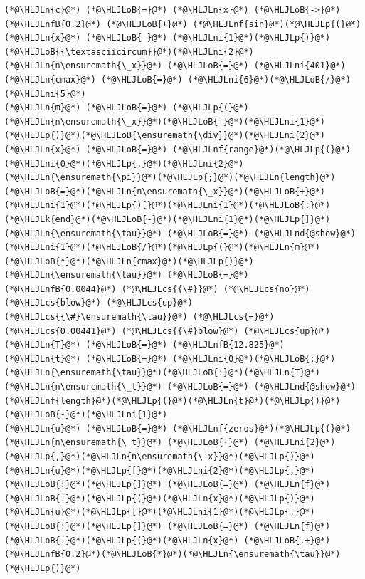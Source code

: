 \documentclass[12pt,a4paper]{article}
\newcommand{\HLJLk}[1]{\textcolor[RGB]{148,91,176}{\textbf{#1}}}
\newcommand{\HLJLn}[1]{#1}
\newcommand{\HLJLnd}[1]{\textcolor[RGB]{214,102,97}{#1}}
\newcommand{\HLJLnf}[1]{\textcolor[RGB]{66,102,213}{#1}}
\newcommand{\HLJLnfB}[1]{\textcolor[RGB]{59,151,46}{#1}}
\newcommand{\HLJLni}[1]{\textcolor[RGB]{59,151,46}{#1}}
\newcommand{\HLJLoB}[1]{\textcolor[RGB]{102,102,102}{\textbf{#1}}}
\newcommand{\HLJLp}[1]{#1}
\newcommand{\HLJLcs}[1]{\textcolor[RGB]{153,153,119}{\textit{#1}}}
\begin{document}
\begin{lstlisting}
(*@\HLJLn{c}@*) (*@\HLJLoB{=}@*) (*@\HLJLn{x}@*) (*@\HLJLoB{->}@*) (*@\HLJLnfB{0.2}@*) (*@\HLJLoB{+}@*) (*@\HLJLnf{sin}@*)(*@\HLJLp{(}@*)(*@\HLJLn{x}@*) (*@\HLJLoB{-}@*) (*@\HLJLni{1}@*)(*@\HLJLp{)}@*)(*@\HLJLoB{{\textasciicircum}}@*)(*@\HLJLni{2}@*)
(*@\HLJLn{n\ensuremath{\_x}}@*) (*@\HLJLoB{=}@*) (*@\HLJLni{401}@*)
(*@\HLJLn{cmax}@*) (*@\HLJLoB{=}@*) (*@\HLJLni{6}@*)(*@\HLJLoB{/}@*)(*@\HLJLni{5}@*)
(*@\HLJLn{m}@*) (*@\HLJLoB{=}@*) (*@\HLJLp{(}@*)(*@\HLJLn{n\ensuremath{\_x}}@*)(*@\HLJLoB{-}@*)(*@\HLJLni{1}@*)(*@\HLJLp{)}@*)(*@\HLJLoB{\ensuremath{\div}}@*)(*@\HLJLni{2}@*)
(*@\HLJLn{x}@*) (*@\HLJLoB{=}@*) (*@\HLJLnf{range}@*)(*@\HLJLp{(}@*)(*@\HLJLni{0}@*)(*@\HLJLp{,}@*)(*@\HLJLni{2}@*)(*@\HLJLn{\ensuremath{\pi}}@*)(*@\HLJLp{;}@*)(*@\HLJLn{length}@*)(*@\HLJLoB{=}@*)(*@\HLJLn{n\ensuremath{\_x}}@*)(*@\HLJLoB{+}@*)(*@\HLJLni{1}@*)(*@\HLJLp{)[}@*)(*@\HLJLni{1}@*)(*@\HLJLoB{:}@*)(*@\HLJLk{end}@*)(*@\HLJLoB{-}@*)(*@\HLJLni{1}@*)(*@\HLJLp{]}@*) 
(*@\HLJLn{\ensuremath{\tau}}@*) (*@\HLJLoB{=}@*) (*@\HLJLnd{@show}@*) (*@\HLJLni{1}@*)(*@\HLJLoB{/}@*)(*@\HLJLp{(}@*)(*@\HLJLn{m}@*)(*@\HLJLoB{*}@*)(*@\HLJLn{cmax}@*)(*@\HLJLp{)}@*)
(*@\HLJLn{\ensuremath{\tau}}@*) (*@\HLJLoB{=}@*) (*@\HLJLnfB{0.0044}@*) (*@\HLJLcs{{\#}}@*) (*@\HLJLcs{no}@*) (*@\HLJLcs{blow}@*) (*@\HLJLcs{up}@*)
(*@\HLJLcs{{\#}\ensuremath{\tau}}@*) (*@\HLJLcs{=}@*) (*@\HLJLcs{0.00441}@*) (*@\HLJLcs{{\#}blow}@*) (*@\HLJLcs{up}@*)
(*@\HLJLn{T}@*) (*@\HLJLoB{=}@*) (*@\HLJLnfB{12.825}@*)
(*@\HLJLn{t}@*) (*@\HLJLoB{=}@*) (*@\HLJLni{0}@*)(*@\HLJLoB{:}@*)(*@\HLJLn{\ensuremath{\tau}}@*)(*@\HLJLoB{:}@*)(*@\HLJLn{T}@*)
(*@\HLJLn{n\ensuremath{\_t}}@*) (*@\HLJLoB{=}@*) (*@\HLJLnd{@show}@*) (*@\HLJLnf{length}@*)(*@\HLJLp{(}@*)(*@\HLJLn{t}@*)(*@\HLJLp{)}@*)(*@\HLJLoB{-}@*)(*@\HLJLni{1}@*)
(*@\HLJLn{u}@*) (*@\HLJLoB{=}@*) (*@\HLJLnf{zeros}@*)(*@\HLJLp{(}@*)(*@\HLJLn{n\ensuremath{\_t}}@*) (*@\HLJLoB{+}@*) (*@\HLJLni{2}@*)(*@\HLJLp{,}@*)(*@\HLJLn{n\ensuremath{\_x}}@*)(*@\HLJLp{)}@*)
(*@\HLJLn{u}@*)(*@\HLJLp{[}@*)(*@\HLJLni{2}@*)(*@\HLJLp{,}@*)(*@\HLJLoB{:}@*)(*@\HLJLp{]}@*) (*@\HLJLoB{=}@*) (*@\HLJLn{f}@*)(*@\HLJLoB{.}@*)(*@\HLJLp{(}@*)(*@\HLJLn{x}@*)(*@\HLJLp{)}@*) 
(*@\HLJLn{u}@*)(*@\HLJLp{[}@*)(*@\HLJLni{1}@*)(*@\HLJLp{,}@*)(*@\HLJLoB{:}@*)(*@\HLJLp{]}@*) (*@\HLJLoB{=}@*) (*@\HLJLn{f}@*)(*@\HLJLoB{.}@*)(*@\HLJLp{(}@*)(*@\HLJLn{x}@*) (*@\HLJLoB{.+}@*) (*@\HLJLnfB{0.2}@*)(*@\HLJLoB{*}@*)(*@\HLJLn{\ensuremath{\tau}}@*)(*@\HLJLp{)}@*)


\end{lstlisting}
\end{document}
